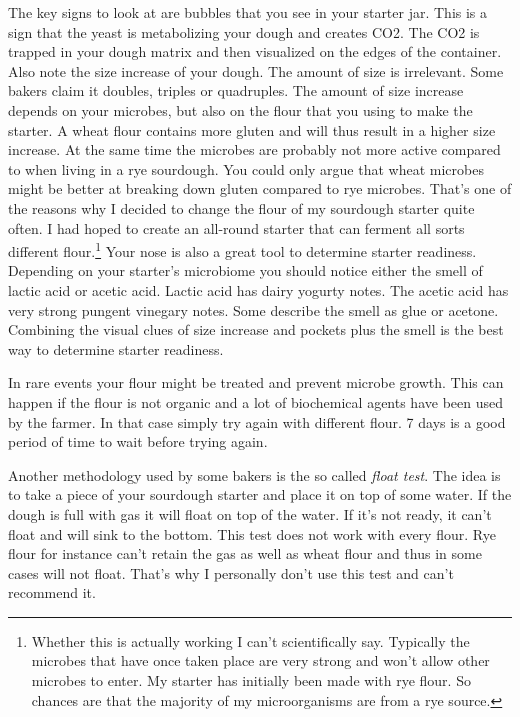 The key signs to look at are bubbles that you see in your starter
jar. This is a sign that the yeast is metabolizing your
dough and creates CO2. The CO2 is trapped in your dough
matrix and then visualized on the edges of the container.
Also note the size increase of your dough. The amount of size
is irrelevant. Some bakers claim it doubles, triples or quadruples.
The amount of size increase depends on your microbes, but also on
the flour that you using to make the starter. A wheat flour contains
more gluten and will thus result in a higher size increase. At
the same time the microbes are probably not more active compared
to when living in a rye sourdough. You could only argue that
wheat microbes might be better at breaking down gluten compared
to rye microbes. That's one of the reasons why I decided to change
the flour of my sourdough starter quite often. I had hoped to create
an all-round starter that can ferment all sorts different flour.\footnote
{Whether this is actually working I can't scientifically say.
Typically the microbes that have once taken place are very strong
and won't allow other microbes to enter. My starter has initially
been made with rye flour. So chances are that the majority of
my microorganisms are from a rye source.} Your nose is also
a great tool to determine starter readiness. Depending on
your starter's microbiome you should notice either the smell
of lactic acid or acetic acid. Lactic acid has dairy yogurty notes.
The acetic acid has very strong pungent vinegary notes. Some
describe the smell as glue or acetone. Combining the visual clues
of size increase and pockets plus the smell is the best way
to determine starter readiness.

In rare events your flour might be treated and prevent microbe growth.
This can happen if the flour is not organic and a lot of biochemical
agents have been used by the farmer. In that case simply try again
with different flour. 7 days is a good period of time to wait before
trying again.

Another methodology used by some bakers is the so called \emph{float test}.
The idea is to take a piece of your sourdough starter and place it
on top of some water. If the dough is full with gas it will float
on top of the water. If it's not ready, it can't float and will
sink to the bottom. This test does not work with every flour.
Rye flour for instance can't retain the gas as well as wheat flour
and thus in some cases will not float. That's why I personally
don't use this test and can't recommend it.

